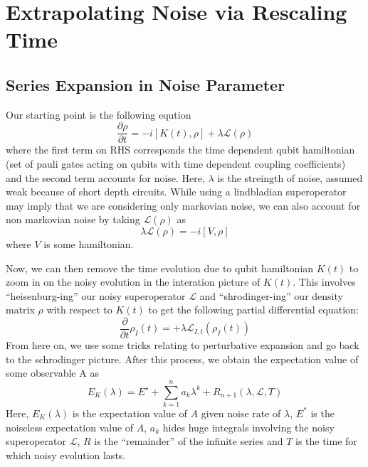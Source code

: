 \documentclass{article}
\begin{document}
\section{Extrapolating Noise via Rescaling Time}
\subsection{Series Expansion in Noise Parameter}
Our starting point is the following eqution
\begin{equation}
  \frac{\partial \rho}{\partial t} = -i[K(t), \rho] + \lambda\mathcal{L}(\rho)
\end{equation}
where the first term on RHS corresponds the time dependent qubit hamiltonian (set
of pauli gates acting on qubits with time dependent coupling coefficients) and the
second term accounts for noise. Here, \(\lambda\) is the streingth of noise, assumed
weak because of short depth circuits. While using a lindbladian superoperator may
imply that we are considering only markovian noise, we can also account for
non markovian noise by taking \(\mathcal{L}(\rho)\) as
\begin{equation}
  \lambda\mathcal{L}(\rho) = -i[V, \rho]
\end{equation}
where \(V\) is some hamiltonian.

Now, we can then remove the time evolution due
to qubit hamiltonian \(K(t)\) to zoom in on the noisy evolution in the
interation picture of \(K(t)\). This involves ``heisenburg-ing'' our noisy
superoperator \(\mathcal{L}\) and ``shrodinger-ing'' our density matrix
\(\rho\) with respect to \(K(t)\) to get the following partial differential equation:
\begin{equation}
  \frac{\partial}{\partial t}\rho_I(t) = + \lambda\mathcal{L}_{I, t}(\rho_I(t))
\end{equation}
From here on, we use some tricks relating to perturbative expansion and go back
to the schrodinger picture. After this process, we obtain the expectation value
of some observable A as
\begin{equation} \label{eq:10}
  E_K(\lambda) = E^\star + \sum_{k=1}^n a_k\lambda^k + R_{n+1}(\lambda, \mathcal{L}, T)
\end{equation}
Here, \(E_K(\lambda)\) is the expectation value of \(A\) given noise rate of
\(\lambda\), \(E^*\) is the noiseless expectation value of \(A\), \(a_k\) hides huge integrals
involving the noisy superoperator \(\mathcal{L}\), \(R\) is the ``remainder''
of the infinite series and \(T\) is the time for which noisy evolution lasts.
\end{document}
